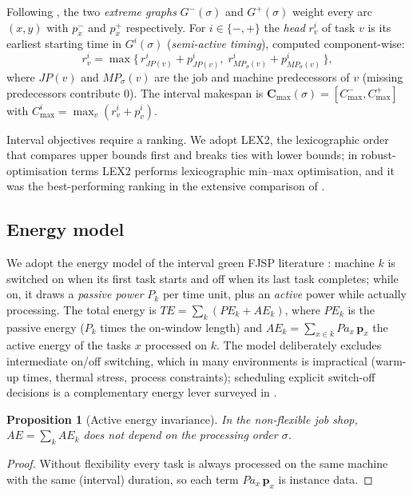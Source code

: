 \documentclass[preprint,12pt]{elsarticle}
\newtheorem{proposition}{Proposition}
\begin{document}
Following \cite{DiazTabu2026}, the two \emph{extreme graphs} $G^-(\sigma)$
and $G^+(\sigma)$ weight every arc $(x,y)$ with $p^-_x$ and $p^+_x$
respectively. For $i\in\{-,+\}$ the \emph{head} $r^i_v$ of task $v$ is its
earliest starting time in $G^i(\sigma)$ (\emph{semi-active timing}),
computed component-wise:
\begin{equation}
r^i_v=\max\bigl\{\,r^i_{JP(v)}+p^i_{JP(v)},\;
r^i_{MP_\sigma(v)}+p^i_{MP_\sigma(v)}\,\bigr\},
\label{eq:heads}
\end{equation}
where $JP(v)$ and $MP_\sigma(v)$ are the job and machine predecessors of
$v$ (missing predecessors contribute $0$). The interval makespan is
$\mathbf{C}_{\max}(\sigma)=[C^-_{\max},C^+_{\max}]$ with
$C^i_{\max}=\max_v (r^i_v+p^i_v)$.

Interval objectives require a ranking. We adopt LEX2, the lexicographic
order that compares upper bounds first and breaks ties with lower bounds;
in robust-optimisation terms LEX2 performs lexicographic min--max
optimisation, and it was the best-performing ranking in the extensive
comparison of \cite{DiazTabu2026}.

\subsection{Energy model}

We adopt the energy model of the interval green FJSP literature
\cite{Afsar2024,Afsar2025}: machine $k$ is switched on when its first task
starts and off when its last task completes; while on, it draws a
\emph{passive power} $P_k$ per time unit, plus an \emph{active} power while
actually processing. The total energy is
$TE=\sum_k (PE_k+AE_k)$, where $PE_k$ is the passive energy ($P_k$ times
the on-window length) and $AE_k=\sum_{x\in k} Pa_{x}\,\mathbf{p}_x$ the
active energy of the tasks $x$ processed on $k$. The model deliberately
excludes intermediate on/off switching, which in many environments is
impractical (warm-up times, thermal stress, process constraints);
scheduling explicit switch-off decisions is a complementary energy lever
surveyed in \cite{Gahm2016}.

\begin{proposition}[Active energy invariance]
\label{prop:ae}
In the non-flexible job shop, $AE=\sum_k AE_k$ does not depend on the
processing order $\sigma$.
\end{proposition}
\begin{proof}
Without flexibility every task is always processed on the same machine with
the same (interval) duration, so each term $Pa_x\,\mathbf{p}_x$ is
instance data. \end{proof}
\end{document}
